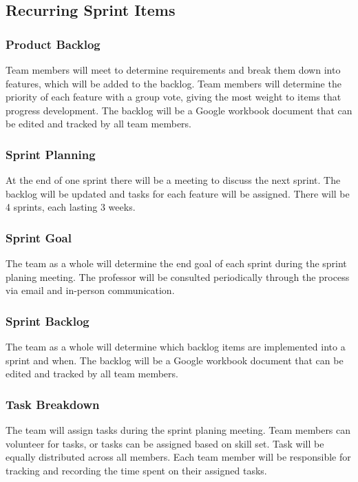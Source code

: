 \subsection{Recurring Sprint Items}

\subsubsection{Product Backlog}
Team members will meet to determine requirements and break them down into features, which will be added to the backlog. Team members will determine the priority of each feature with a group vote, giving the most weight to items that progress development. The backlog will be a Google workbook document that can be edited and tracked by all team members.

\subsubsection{Sprint Planning}
At the end of one sprint there will be a meeting to discuss the next sprint. The backlog will be updated and tasks for each feature will be assigned. There will be 4 sprints, each lasting 3 weeks.

\subsubsection{Sprint Goal}
The team as a whole will determine the end goal of each sprint during the sprint planing meeting. The professor will be consulted periodically through the process via email and in-person communication. 

\subsubsection{Sprint Backlog}
The team as a whole will determine which backlog items are implemented into a sprint and when. The backlog will be a Google workbook document that can be edited and tracked by all team members.

\subsubsection{Task Breakdown}
The team will assign tasks during the sprint planing meeting. Team members can volunteer for tasks, or tasks can be assigned based on skill set. Task will be equally distributed across all members. Each team member will be responsible for tracking and recording the time spent on their assigned tasks. 

